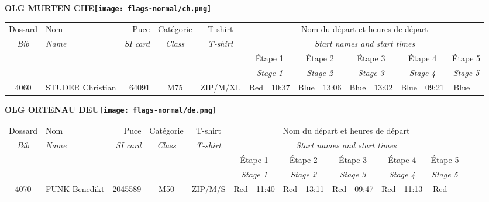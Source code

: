 \documentclass{report}
\begin{document}
\newpage
  \Huge \centering \bfseries OLG MURTEN  CHE\normalfont \footnotesize \sffamily \hfill \texttt{[image: flags-normal/ch.png]} \newline 
  \begin{longtable}{|c|l|r|c|c|*{5}{cc|}}
    Dossard & Nom  & Puce    & Catégorie & T-shirt & \multicolumn{10}{c|}{Nom du départ et heures de départ} \\
    \itshape Bib     & \itshape Name & \itshape SI card & \itshape Class  & \itshape  T-shirt  & \multicolumn{10}{c|}{\itshape Start names and start times} \\
    \hline
    & & & & & \multicolumn{2}{c|}{Étape 1} & \multicolumn{2}{c|}{Étape 2} & \multicolumn{2}{c|}{Étape 3} & \multicolumn{2}{c|}{Étape 4} & \multicolumn{2}{c|}{Étape 5} \\
    & & & & & \multicolumn{2}{c|}{\itshape Stage 1} & \multicolumn{2}{c|}{\itshape Stage 2} & \multicolumn{2}{c|}{\itshape Stage 3} & \multicolumn{2}{c|}{\itshape Stage 4} & \multicolumn{2}{c|}{\itshape Stage 5} \\
    \hline
    4060 & STUDER Christian & 64091 & M75 & ZIP/M/XL & Red & 10:37 & Blue & 13:06 & Blue & 13:02 & Blue & 09:21 & Blue &  \\
  \end{longtable}
\newpage
  \Huge \centering \bfseries OLG ORTENAU  DEU\normalfont \footnotesize \sffamily \hfill \texttt{[image: flags-normal/de.png]} \newline 
  \begin{longtable}{|c|l|r|c|c|*{5}{cc|}}
    Dossard & Nom  & Puce    & Catégorie & T-shirt & \multicolumn{10}{c|}{Nom du départ et heures de départ} \\
    \itshape Bib     & \itshape Name & \itshape SI card & \itshape Class  & \itshape  T-shirt  & \multicolumn{10}{c|}{\itshape Start names and start times} \\
    \hline
    & & & & & \multicolumn{2}{c|}{Étape 1} & \multicolumn{2}{c|}{Étape 2} & \multicolumn{2}{c|}{Étape 3} & \multicolumn{2}{c|}{Étape 4} & \multicolumn{2}{c|}{Étape 5} \\
    & & & & & \multicolumn{2}{c|}{\itshape Stage 1} & \multicolumn{2}{c|}{\itshape Stage 2} & \multicolumn{2}{c|}{\itshape Stage 3} & \multicolumn{2}{c|}{\itshape Stage 4} & \multicolumn{2}{c|}{\itshape Stage 5} \\
    \hline
    4070 & FUNK Benedikt & 2045589 & M50 & ZIP/M/S & Red & 11:40 & Red & 13:11 & Red & 09:47 & Red & 11:13 & Red &  \\
  \end{longtable}
\end{document}
